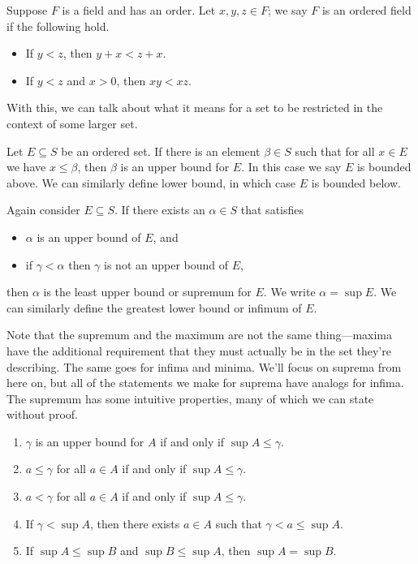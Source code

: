 \documentclass[../m131main.tex]{subfiles}
\begin{document}
\begin{definition}
    Suppose $F$ is a field and has an order.
    Let $x,y,z \in F$;
    we say $F$ is an ordered field if the following hold.
    \begin{itemize}
        \item If $y < z$, then $y + x < z + x$.
        \item If $y < z$ and $x > 0$, then $xy < xz$.   
    \end{itemize}
\end{definition}

With this, we can talk about what it means for a set to be restricted in the context of some larger set.

\begin{definition}
    Let $E \subseteq S$ be an ordered set.
    If there is an element $\beta \in S$ such that for all $x \in E$ we have $x \leq \beta$, then $\beta$ is an upper bound for $E$.
    In this case we say $E$ is bounded above.
    We can similarly define lower bound, in which case $E$ is bounded below.
\end{definition}

\begin{definition}
    Again consider $E \subseteq S$.
    If there exists an $\alpha \in S$ that satisfies
    \begin{itemize}
        \item $\alpha$ is an upper bound of $E$, and
        \item if $\gamma < \alpha$ then $\gamma$ is not an upper bound of $E$,
    \end{itemize}
    then $\alpha$ is the least upper bound or supremum for $E$.
    We write $\alpha = \sup E$.
    We can similarly define the greatest lower bound or infimum of $E$.
\end{definition}

Note that the supremum and the maximum are not the same thing---maxima have the additional requirement that they must actually be in the set they're describing.
The same goes for infima and minima.
We'll focus on suprema from here on, but all of the statements we make for suprema have analogs for infima.
The supremum has some intuitive properties, many of which we can state without proof.

\begin{theorem} \label{thm:sup_props}
    \begin{enumerate}[label=(\alph*)]
        \item $\gamma$ is an upper bound for $A$ if and only if $\sup A \leq \gamma$.
        \item $a \leq \gamma$ for all $a \in A$ if and only if $\sup A \leq \gamma$.
        \item $a < \gamma$ for all $a \in A$ if and only if $\sup A \leq \gamma$.
        \item If $\gamma < \sup A$, then there exists $a \in A$ such that $\gamma < a \leq \sup A$.
        \item If $\sup A \leq \sup B$ and $\sup B \leq \sup A$, then $\sup A = \sup B$.
    \end{enumerate}
\end{theorem}
\end{document}
